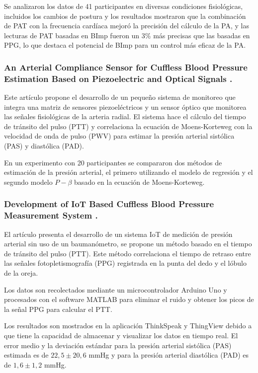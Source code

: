     Se analizaron los datos de 41 participantes en diversas condiciones fisiológicas, incluidos los cambios de postura y los resultados mostraron que la combinación de PAT con la frecuencia cardíaca 
    mejoró la precisión del cálculo de la PA, y las lecturas de PAT basadas en BImp fueron un 3\% más precisas que las basadas en PPG, lo que destaca el potencial de BImp para un control más eficaz de la PA.

    \subsubsection*{An Arterial Compliance Sensor for Cuffless Blood Pressure Estimation Based on Piezoelectric and Optical Signals \cite{piezoelectric}.}

    Este artículo propone el desarrollo de un pequeño sistema de monitoreo que integra una matriz de sensores piezoeléctricos y un sensor óptico que monitorea las señales fisiológicas de la arteria radial. El sistema hace el cálculo del tiempo de tránsito del pulso (PTT) y correlaciona la ecuación de Moens-Korteweg con la velocidad de onda de pulso (PWV) para estimar la presión arterial sistólica (PAS) y diastólica (PAD).

    En un experimento con 20 participantes se compararon dos métodos de estimación de la presión arterial, el primero utilizando el modelo de regresión y el segundo modelo $P-\beta$ basado en la ecuación de Moens-Korteweg.

    \subsubsection*{Development of IoT Based Cuffless Blood Pressure Measurement System \cite{Norsuriati_2021}.}

    El artículo presenta el desarrollo de un sistema IoT de medición de presión arterial sin uso de un baumanómetro, se propone un método basado en el tiempo de tránsito del pulso (PTT). Este método correlaciona el tiempo de retraso entre las señales fotopletismografía (PPG) registrada en la punta del dedo y el lóbulo de la oreja.

    Los datos son recolectados mediante un microcontrolador Arduino Uno y procesados con el software MATLAB para eliminar el ruido y obtener los picos de la señal PPG para calcular el PTT.
    
    Los resultados son mostrados en la aplicación ThinkSpeak y ThingView debido a que tiene la capacidad de almacenar y visualizar los datos en tiempo real. El error medio y la deviación estándar para la presión arterial sistólica (PAS) estimada es de $22,5 \pm 20,6$ mmHg y para la presión arterial diastólica (PAD) es de $1,6 \pm 1,2$ mmHg.

